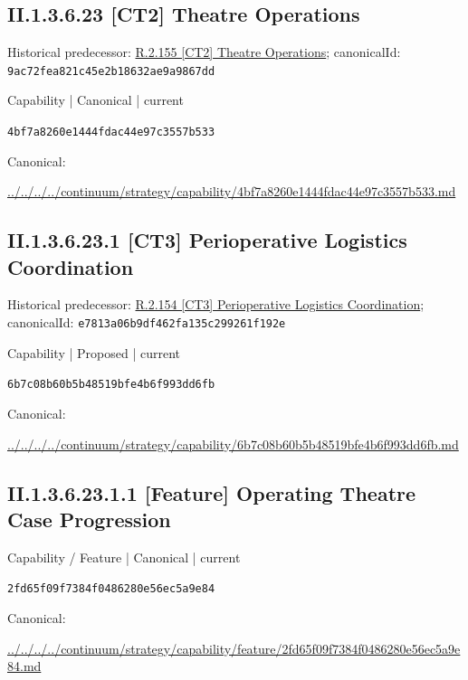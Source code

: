 \documentclass[10pt,a4paper]{article}
\begin{document}
\subsection*{II.1.3.6.23 [CT2] Theatre Operations}
Historical predecessor: \hyperref[element-9ac72fea821c45e2b18632ae9a9867dd]{R.2.155 [CT2] Theatre Operations}; canonicalId: \texttt{9ac72fea821c45e2b18632ae9a9867dd}\par
\label{element-4bf7a8260e1444fdac44e97c3557b533}
{\small Capability | Canonical | current}\par
\texttt{4bf7a8260e1444fdac44e97c3557b533}\par
Canonical: \par
{\footnotesize\url{../../../../continuum/strategy/capability/4bf7a8260e1444fdac44e97c3557b533.md}}\par
\subsection*{II.1.3.6.23.1 [CT3] Perioperative Logistics Coordination}
Historical predecessor: \hyperref[element-e7813a06b9df462fa135c299261f192e]{R.2.154 [CT3] Perioperative Logistics Coordination}; canonicalId: \texttt{e7813a06b9df462fa135c299261f192e}\par
\label{element-6b7c08b60b5b48519bfe4b6f993dd6fb}
{\small Capability | Proposed | current}\par
\texttt{6b7c08b60b5b48519bfe4b6f993dd6fb}\par
Canonical: \par
{\footnotesize\url{../../../../continuum/strategy/capability/6b7c08b60b5b48519bfe4b6f993dd6fb.md}}\par
\subsection*{II.1.3.6.23.1.1 [Feature] Operating Theatre Case Progression}
\label{element-2fd65f09f7384f0486280e56ec5a9e84}
{\small Capability / Feature | Canonical | current}\par
\texttt{2fd65f09f7384f0486280e56ec5a9e84}\par
Canonical: \par
{\footnotesize\url{../../../../continuum/strategy/capability/feature/2fd65f09f7384f0486280e56ec5a9e84.md}}\par
\end{document}
